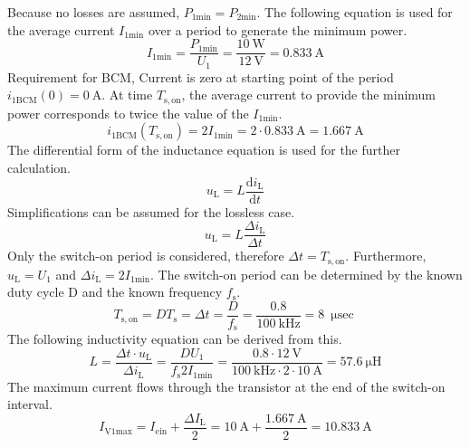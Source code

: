 \begin{solutionblock}
    Because no losses are assumed, $P_{\mathrm{1min}}=P_{\mathrm{2min}}$.
    The following equation is used for the average current $I_{\mathrm{1min}}$ over a period to generate the minimum power.
    \begin{equation}
        I_{\mathrm{1min}} = \frac{P_{\mathrm{1min}}}{U_{\mathrm{1}}} = \frac{\SI{10}{\watt}}{\SI{12}{\volt}}= \SI{0.833}{\ampere}
    \end{equation}
    Requirement for BCM, Current is zero at starting point of the period  $i_\mathrm{1BCM}(0)=\SI{0}{\ampere}$.
    At time $T_{\mathrm{s,on}}$, the average current to provide the minimum power corresponds to twice the value of the $I_{\mathrm{1min}}$.
    \begin{equation}
        i_\mathrm{1BCM}(T_{\mathrm{s,on}})= 2I_{\mathrm{1min}}= 2\cdot \SI{0.833}{\ampere} = \SI{1.667}{\ampere}
    \end{equation}
    The differential form of the inductance equation is used for the further calculation.
    \begin{equation}
        u_\mathrm{L}=L\frac{\mathrm{d}i_\mathrm{L}}{\mathrm{d}t}
    \end{equation}
    Simplifications can be assumed for the lossless case.
    \begin{equation}
        u_\mathrm{L}=L\frac{\Delta i_\mathrm{L}}{\Delta t}
    \end{equation}
    Only the switch-on period is considered, therefore $\Delta t = T_{\mathrm{s,on}}$. Furthermore, $u_\mathrm{L}=U_\mathrm{1}$ and $\Delta i_\mathrm{L} = 2 I_\mathrm{1min}$.
    The switch-on period can be determined by the known duty cycle D and the known frequency $f_{\mathrm{s}}$.
    \begin{equation}
        T_{\mathrm{s,on}} = D T_{\mathrm{s}} = \Delta t = \frac{D}{f_{\mathrm{s}}} = \frac{0.8}{\SI{100}{\kilo\hertz}}=\SI{8}{\micro\sec}
    \end{equation}
    The following inductivity equation can be derived from this.
    \begin{equation}
        L=\frac{\Delta t \cdot u_\mathrm{L} }{\Delta i_\mathrm{L}}= \frac{D U_\mathrm{1}}{f_{\mathrm{s}}2I_{\mathrm{1min}}} = \frac{0.8 \cdot \SI{12}{\volt}}{\SI{100}{\kilo\hertz\cdot 2\cdot \SI{10}{\ampere}}} = \SI{57.6}{\micro\henry}
    \end{equation}
    The maximum current flows through the transistor at the end of the switch-on interval.
    \begin{equation}
        I_\mathrm{V1max} = I_\mathrm{ein} + \frac{\Delta I_\mathrm{L}}{2}=\SI{10}{\ampere}+\frac{\SI{1.667}{\ampere}}{2} = \SI{10.833}{\ampere}
    \end{equation}
\end{solutionblock}


